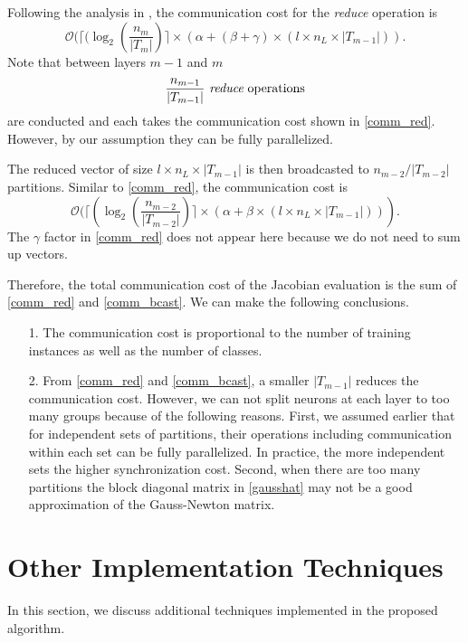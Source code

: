 \documentclass[12pt]{article}
\begin{document}
Following the analysis in \cite{JP07b}, the communication cost for the {\it reduce} operation is
\begin{equation}
\label{comm_red}
\mathcal {O}(\lceil (\log_2 ( \frac{n_m}{|T_m|}) \rceil \times \left(\alpha + (\beta + \gamma)\times( l \times n_L \times |T_{m-1}|)\right).
\end{equation}
Note that between layers $m-1$ and $m$
\begin{equation*}
    \frac{n_{m-1}}{|T_{m-1}|}\ \text{{\it reduce} operations}
\end{equation*}
are conducted and each takes the communication cost shown in \eqref{comm_red}. However, by our assumption they can be fully parallelized.

The reduced vector of size $l \times n_L \times |T_{m-1}|$ is then broadcasted to $n_{m-2}/|T_{m-2}|$ partitions. 
Similar to \eqref{comm_red}, the communication cost is
\begin{equation}
  \label{comm_bcast}
  \mathcal {O}(\lceil (\log_2 ( \frac{n_{m-2}}{|T_{m-2}|}) \rceil \times ( \alpha + \beta \times ( l \times n_L \times |T_{m-1}|) ) ).
\end{equation}
The $\gamma$ factor in \eqref{comm_red} does not appear here because we do not need to sum up vectors. 
\par Therefore, the total communication cost of the Jacobian evaluation is the sum of 
\eqref{comm_red} and \eqref{comm_bcast}. We can make the following conclusions.
\begin{enumerate}
    \item[1.] The communication cost is proportional to the number of training instances as well as the number of classes.
    \item[2.] From \eqref{comm_red} and \eqref{comm_bcast}, a smaller $|T_{m-1}|$ reduces the communication cost. However, we can not split neurons at each layer to too many groups because of the following reasons. First, we assumed earlier that for independent sets of partitions, their operations including communication within each set can be fully parallelized. In practice, the more independent sets the higher synchronization cost. Second, when there are too many partitions the block diagonal matrix in \eqref{gausshat} may not be a good approximation of the Gauss-Newton matrix.
\end{enumerate}

\section{Other Implementation Techniques}
\label{sec:other-implement}
In this section, we discuss additional techniques implemented in the proposed algorithm.
\end{document}
